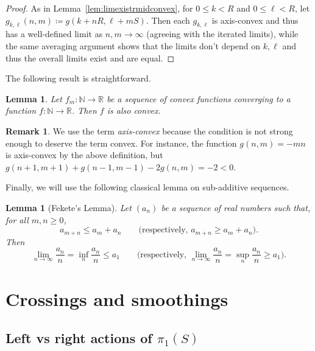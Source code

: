 \documentclass[11pt]{amsart}
\numberwithin{equation}{section}
\numberwithin{figure}{section}
\newtheorem{lemma}[theorem]{Lemma}
\theoremstyle{definition}
\newtheorem{remark}[theorem]{Remark}
\theoremstyle{plain}
\begin{document}
\begin{proof}
  As in Lemma~\ref{lem:limexistrmidconvex}, for $0 \le k < R$ and $0
  \le \ell < R$, let $g_{k,\ell}(n,m) \coloneqq g(k+nR, \ell+mS)$.
  Then each $g_{k,\ell}$ is axis-convex and thus has a well-defined limit
  as $n,m \to \infty$ (agreeing with the iterated limits), while the
  same averaging argument shows that the limits don't depend on
  $k,\ell$ and thus the overall limits exist and are equal.
\end{proof}

The following result is straightforward.

 \begin{lemma}
 Let $f_m \colon \mathbb{N} \to \mathbb{R}$ be a sequence of convex functions converging to a  function
 $f \colon \mathbb{N} \to \mathbb{R}$. Then $f$ is also convex.
 \label{lem:limitconvex}
 \end{lemma}

 \begin{remark}
  We use the term \emph{axis-convex} because the condition is not
  strong enough to deserve the term convex. For instance, the
  function $g(n,m) = -mn$ is axis-convex by the above definition, but
  $g(n+1,m+1) + g(n-1,m-1) - 2g(n,m) = -2 < 0$.
\end{remark}

Finally, we will use the following classical lemma on sub-additive sequences.
\begin{lemma}[Fekete's Lemma]\label{lem:fekete}
Let $(a_n)$ be a sequence of real numbers such that, for all $m,n\ge 0$,
\[
a_{m+n} \le a_m + a_n 
\qquad \text{(respectively, } a_{m+n} \ge a_m + a_n\text{).}
\]
Then
\[
\lim_{n\to\infty} \frac{a_n}{n}
= \inf_{n} \frac{a_n}{n} \le a_1
\qquad \text{(respectively, } 
\lim_{n\to\infty} \frac{a_n}{n}
= \sup_{n} \frac{a_n}{n} \ge a_1\text{).}
\]
\end{lemma}



\section{Crossings and smoothings}
\label{sec:smoothing}



\subsection{Left vs right actions of \texorpdfstring{$\pi_1(S)$}{π1(S)}}
\label{sec:actions}
\end{document}
